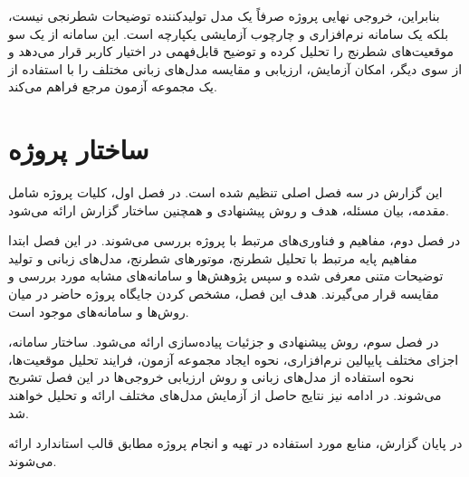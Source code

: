 بنابراین، خروجی نهایی پروژه صرفاً یک مدل تولیدکننده توضیحات شطرنجی نیست، بلکه یک سامانه نرم‌افزاری و چارچوب آزمایشی یکپارچه است. این سامانه از یک سو موقعیت‌های شطرنج را تحلیل کرده و توضیح قابل‌فهمی در اختیار کاربر قرار می‌دهد و از سوی دیگر، امکان آزمایش، ارزیابی و مقایسه مدل‌های زبانی مختلف را با استفاده از یک مجموعه آزمون مرجع فراهم می‌کند.

\section{ساختار پروژه}

این گزارش در سه فصل اصلی تنظیم شده است. در فصل اول، کلیات پروژه شامل مقدمه، بیان مسئله، هدف و روش پیشنهادی و همچنین ساختار گزارش ارائه می‌شود.

در فصل دوم، مفاهیم و فناوری‌های مرتبط با پروژه بررسی می‌شوند. در این فصل ابتدا مفاهیم پایه مرتبط با تحلیل شطرنج، موتورهای شطرنج، مدل‌های زبانی و تولید توضیحات متنی معرفی شده و سپس پژوهش‌ها و سامانه‌های مشابه مورد بررسی و مقایسه قرار می‌گیرند. هدف این فصل، مشخص کردن جایگاه پروژه حاضر در میان روش‌ها و سامانه‌های موجود است.

در فصل سوم، روش پیشنهادی و جزئیات پیاده‌سازی ارائه می‌شود. ساختار سامانه، اجزای مختلف پایپالین نرم‌افزاری، نحوه ایجاد مجموعه آزمون، فرایند تحلیل موقعیت‌ها، نحوه استفاده از مدل‌های زبانی و روش ارزیابی خروجی‌ها در این فصل تشریح می‌شوند. در ادامه نیز نتایج حاصل از آزمایش مدل‌های مختلف ارائه و تحلیل خواهند شد.

در پایان گزارش، منابع مورد استفاده در تهیه و انجام پروژه مطابق قالب استاندارد ارائه می‌شوند.
